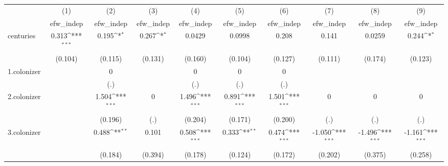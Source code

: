 {
\def\sym#1{\ifmmode^{#1}\else\(^{#1}\)\fi}
\begin{tabular}{l*{9}{c}}
\hline\hline
            &\multicolumn{1}{c}{(1)}&\multicolumn{1}{c}{(2)}&\multicolumn{1}{c}{(3)}&\multicolumn{1}{c}{(4)}&\multicolumn{1}{c}{(5)}&\multicolumn{1}{c}{(6)}&\multicolumn{1}{c}{(7)}&\multicolumn{1}{c}{(8)}&\multicolumn{1}{c}{(9)}\\
            &\multicolumn{1}{c}{efw\_indep}&\multicolumn{1}{c}{efw\_indep}&\multicolumn{1}{c}{efw\_indep}&\multicolumn{1}{c}{efw\_indep}&\multicolumn{1}{c}{efw\_indep}&\multicolumn{1}{c}{efw\_indep}&\multicolumn{1}{c}{efw\_indep}&\multicolumn{1}{c}{efw\_indep}&\multicolumn{1}{c}{efw\_indep}\\
\hline
centuries   &       0.313\sym{***}&       0.195\sym{*}  &       0.267\sym{*}  &      0.0429         &      0.0998         &       0.208         &       0.141         &      0.0259         &       0.244\sym{*}  \\
            &     (0.104)         &     (0.115)         &     (0.131)         &     (0.160)         &     (0.104)         &     (0.127)         &     (0.111)         &     (0.174)         &     (0.123)         \\
[1em]
1.colonizer &                     &           0         &                     &           0         &           0         &           0         &                     &                     &                     \\
            &                     &         (.)         &                     &         (.)         &         (.)         &         (.)         &                     &                     &                     \\
[1em]
2.colonizer &                     &       1.504\sym{***}&           0         &       1.496\sym{***}&       0.891\sym{***}&       1.501\sym{***}&           0         &           0         &           0         \\
            &                     &     (0.196)         &         (.)         &     (0.204)         &     (0.171)         &     (0.200)         &         (.)         &         (.)         &         (.)         \\
[1em]
3.colonizer &                     &       0.488\sym{**} &       0.101         &       0.508\sym{***}&       0.333\sym{**} &       0.474\sym{***}&      -1.050\sym{***}&      -1.496\sym{***}&      -1.161\sym{***}\\
            &                     &     (0.184)         &     (0.394)         &     (0.178)         &     (0.124)         &     (0.172)         &     (0.202)         &     (0.375)         &     (0.258)         \\

\end{tabular}}
